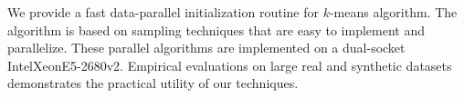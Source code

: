 We provide a fast data-parallel initialization routine for $k$-means algorithm. 
The algorithm is based on sampling techniques that are easy to implement and parallelize. 
These parallel algorithms are implemented on a dual-socket Intel\textregistered Xeon\textregistered E5-2680v2. 
Empirical evaluations on large real and synthetic datasets demonstrates the practical utility of our techniques.